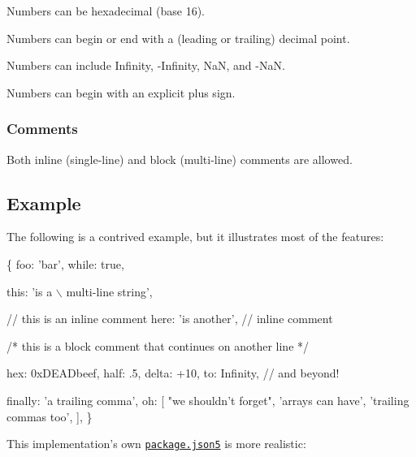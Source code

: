 \begin{DoxyItemize}
\item Numbers can be hexadecimal (base 16).
\item Numbers can begin or end with a (leading or trailing) decimal point.
\item Numbers can include {\ttfamily Infinity}, {\ttfamily -\/\+Infinity}, {\ttfamily NaN}, and {\ttfamily -\/\+NaN}.
\item Numbers can begin with an explicit plus sign.
\end{DoxyItemize}

\subsubsection*{Comments}


\begin{DoxyItemize}
\item Both inline (single-\/line) and block (multi-\/line) comments are allowed.
\end{DoxyItemize}

\subsection*{Example}

The following is a contrived example, but it illustrates most of the features\+:


\begin{DoxyCode}
\{
    foo: 'bar',
    while: true,

    this: 'is a \(\backslash\)
multi-line string',

    // this is an inline comment
    here: 'is another', // inline comment

    /* this is a block comment
       that continues on another line */

    hex: 0xDEADbeef,
    half: .5,
    delta: +10,
    to: Infinity,   // and beyond!

    finally: 'a trailing comma',
    oh: [
        "we shouldn't forget",
        'arrays can have',
        'trailing commas too',
    ],
\}
\end{DoxyCode}


This implementation’s own \href{package.json5}{\tt package.\+json5} is more realistic\+:


